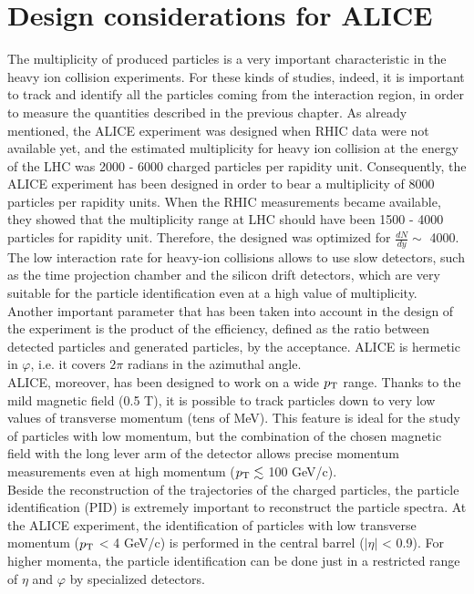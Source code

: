 \section{Design considerations for ALICE}
The multiplicity of produced particles is a very important characteristic in the heavy ion collision experiments. For these kinds of studies, indeed, it is important to track and identify all the particles coming from the interaction region, in order to measure the quantities described in the previous chapter. As already mentioned, the ALICE experiment was designed when RHIC data were not available yet, and the estimated multiplicity for heavy ion collision at the energy of the LHC was 2000 - 6000 charged particles per rapidity unit. Consequently, the ALICE experiment has been designed in order to bear a multiplicity of 8000 particles per rapidity units. When the RHIC measurements became available, they showed that the multiplicity range at LHC should have been 1500 - 4000 particles for rapidity unit. Therefore, the designed was optimized for $\frac{dN}{dy}\sim$ 4000. The low interaction rate for heavy-ion collisions allows to use slow detectors, such as the time projection chamber and the silicon drift detectors, which are very suitable for the particle identification even at a high value of multiplicity.
Another important parameter that has been taken into account in the design of the experiment is the product of the efficiency, defined as the ratio between detected particles and generated particles, by the acceptance. ALICE is hermetic in $\varphi$, i.e. it covers $2\pi$ radians in the azimuthal angle.\\
ALICE, moreover, has been designed to work on a wide $p_\text{T}$ range. Thanks to the mild magnetic field (0.5 T), it is possible to track particles down to very low values of transverse momentum (tens of MeV). This feature is ideal for the study of particles with low momentum, but the combination of the chosen magnetic field with the long lever arm of the detector allows precise momentum measurements even at high momentum ($p_\text{T}\lesssim$ 100 GeV/c).\\
Beside the reconstruction of the trajectories of the charged particles, the particle identification (PID) is extremely important to reconstruct the particle spectra. At the ALICE experiment, the identification of particles with low transverse momentum ($p_\text{T}$ < 4 GeV/c) is performed in the central barrel ($|\eta|$ < 0.9). For higher momenta, the particle identification can be done just in a restricted range of $\eta$ and $\varphi$ by specialized detectors.
